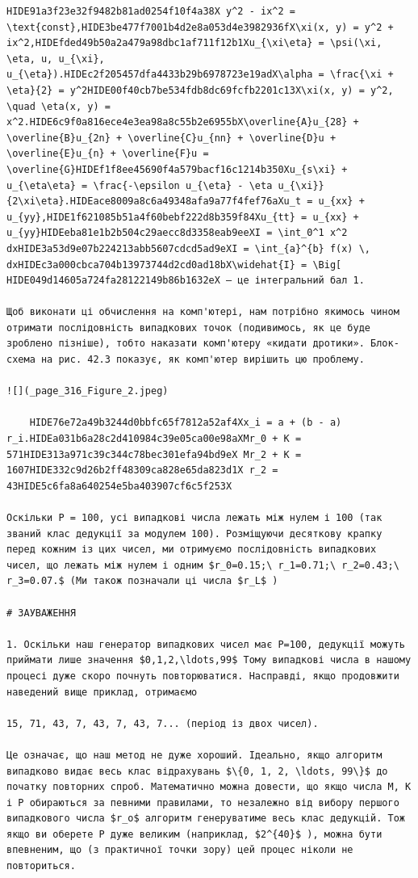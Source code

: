 \documentclass[
  ukrainian,
]{article}
\begin{document}
\begin{verbatim}
HIDE91a3f23e32f9482b81ad0254f10f4a38X y^2 - ix^2 = \text{const},HIDE3be477f7001b4d2e8a053d4e3982936fX\xi(x, y) = y^2 + ix^2,HIDEfded49b50a2a479a98dbc1af711f12b1Xu_{\xi\eta} = \psi(\xi, \eta, u, u_{\xi}, u_{\eta}).HIDEc2f205457dfa4433b29b6978723e19adX\alpha = \frac{\xi + \eta}{2} = y^2HIDE00f40cb7be534fdb8dc69fcfb2201c13X\xi(x, y) = y^2, \quad \eta(x, y) = x^2.HIDE6c9f0a816ece4e3ea98a8c55b2e6955bX\overline{A}u_{28} + \overline{B}u_{2n} + \overline{C}u_{nn} + \overline{D}u + \overline{E}u_{n} + \overline{F}u = \overline{G}HIDEf1f8ee45690f4a579bacf16c1214b350Xu_{s\xi} + u_{\eta\eta} = \frac{-\epsilon u_{\eta} - \eta u_{\xi}}{2\xi\eta}.HIDEace8009a8c6a49348afa9a77f4fef76aXu_t = u_{xx} + u_{yy},HIDE1f621085b51a4f60bebf222d8b359f84Xu_{tt} = u_{xx} + u_{yy}HIDEeba81e1b2b504c29aecc8d3358eab9eeXI = \int_0^1 x^2 dxHIDE3a53d9e07b224213abb5607cdcd5ad9eXI = \int_{a}^{b} f(x) \, dxHIDEc3a000cbca704b13973744d2cd0ad18bX\widehat{I} = \Big[
HIDE049d14605a724fa28122149b86b1632eX — це інтегральний бал 1.

Щоб виконати ці обчислення на комп'ютері, нам потрібно якимось чином отримати послідовність випадкових точок (подивимось, як це буде зроблено пізніше), тобто наказати комп'ютеру «кидати дротики». Блок-схема на рис. 42.3 показує, як комп'ютер вирішить цю проблему.

![](_page_316_Figure_2.jpeg)

    HIDE76e72a49b3244d0bbfc65f7812a52af4Xx_i = a + (b - a) r_i.HIDEa031b6a28c2d410984c39e05ca00e98aXMr_0 + K = 571HIDE313a971c39c344c78bec301efa94bd9eX Mr_2 + K = 1607HIDE332c9d26b2ff48309ca828e65da823d1X r_2 = 43HIDE5c6fa8a640254e5ba403907cf6c5f253X

Оскільки P = 100, усі випадкові числа лежать між нулем і 100 (так званий клас дедукції за модулем 100). Розміщуючи десяткову крапку перед кожним із цих чисел, ми отримуємо послідовність випадкових чисел, що лежать між нулем і одним $r_0=0.15;\ r_1=0.71;\ r_2=0.43;\ r_3=0.07.$ (Ми також позначали ці числа $r_L$ )

# ЗАУВАЖЕННЯ

1. Оскільки наш генератор випадкових чисел має P=100, дедукції можуть приймати лише значення $0,1,2,\ldots,99$ Тому випадкові числа в нашому процесі дуже скоро почнуть повторюватися. Насправді, якщо продовжити наведений вище приклад, отримаємо

15, 71, 43, 7, 43, 7, 43, 7... (період із двох чисел).

Це означає, що наш метод не дуже хороший. Ідеально, якщо алгоритм випадково видає весь клас відрахувань $\{0, 1, 2, \ldots, 99\}$ до початку повторних спроб. Математично можна довести, що якщо числа M, K і P обираються за певними правилами, то незалежно від вибору першого випадкового числа $r_o$ алгоритм генеруватиме весь клас дедукцій. Тож якщо ви оберете P дуже великим (наприклад, $2^{40}$ ), можна бути впевненим, що (з практичної точки зору) цей процес ніколи не повториться.


\end{verbatim}
\end{document}
